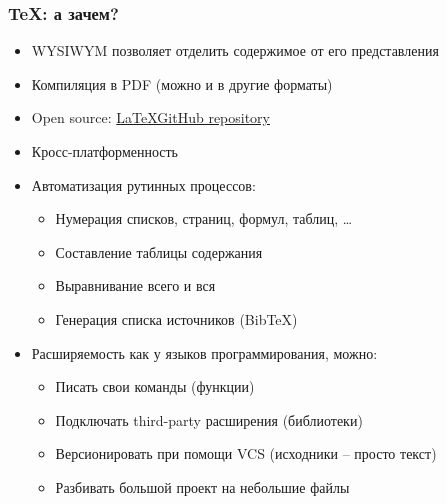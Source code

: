 \begin{frame}

\frametitle{\TeX: а зачем?}

\begin{itemize}[<+->]
    \item WYSIWYM позволяет отделить содержимое от его представления
    \item Компиляция в PDF (можно и в другие форматы)
    \item Open source: \href{https://github.com/latex3}{\color{blue} \LaTeX \enspace GitHub repository}
    \item Кросс-платформенность
    \item Автоматизация рутинных процессов:
    \begin{itemize}
        \item Нумерация списков, страниц, формул, таблиц, \dots
        \item Составление таблицы содержания
        \item Выравнивание всего и вся
        \item Генерация списка источников (BibTeX)
    \end{itemize}
    \item Расширяемость как у языков программирования, можно:
    \begin{itemize}
        \item Писать свои команды (функции)
        \item Подключать third-party расширения (библиотеки)
        \item Версионировать при помощи VCS (исходники -- просто текст)
        \item Разбивать большой проект на небольшие файлы
    \end{itemize}
\end{itemize}

\end{frame}

